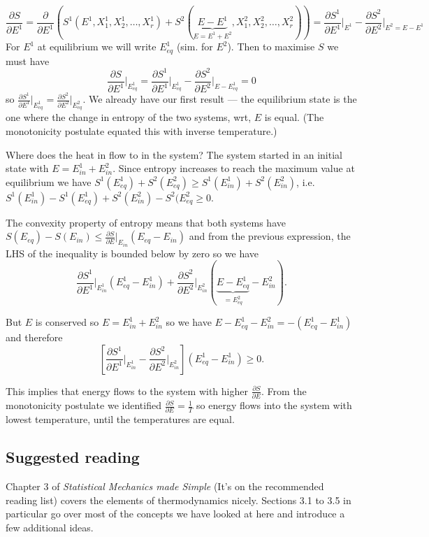 \documentclass{article}
\begin{document}
$$\frac{\partial S}{\partial E^1} = \frac{\partial}{\partial E^1}\left(S^1(E^1,X_1^1,X_2^1,\ldots,X_r^1) + S^2(\underbrace{E-E^1}_{E=E^1+E^2},X_1^2,X_2^2,\ldots,X_r^2) \right) = \frac{\partial S^1}{\partial E^1}\bigg\vert_{E^1} -  \frac{\partial S^2}{\partial E^2}\bigg\vert_{E^2=E-E^1}$$
For $E^1$ at equilibrium we will write $E^1_{eq}$ (sim. for $E^2$). Then to maximise $S$ we must have
$$\frac{\partial S}{\partial E^1}\bigg\vert_{E^1_{eq}} = \frac{\partial S^1}{\partial E^1}\bigg\vert_{E^1_{eq}} - \frac{\partial S^2}{\partial E^2}\bigg\vert_{E-E^1_{eq}}=0$$
so $\frac{\partial S^1}{\partial E^1}\vert_{E^1_{eq}} = \frac{\partial S^2}{\partial E^2}\vert_{E_{eq}^2}$. We already have our first result --- the equilibrium state is the one where the change in entropy of the two systems, wrt, $E$ is equal. (The  monotonicity postulate equated this with inverse temperature.)

Where does the heat in flow to in the system? The system started in an initial state with $E = E^1_{in}+E^2_{in}$. Since entropy increases to reach the maximum  value at equilibrium we have $S^1(E^1_{eq}) + S^2(E^2_{eq}) \geq S^1(E^1_{in}) + S^2(E^2_{in})$, i.e. $ S^1(E^1_{in}) - S^1(E^1_{eq})  +  S^2(E^2_{in}) - S^2(E^2_{eq}\geq 0$.

The convexity property of entropy means that both systems have $S(E_{eq})-S(E_{in})\leq \frac{\partial S}{\partial E}\vert_{E_{in}}(E_{eq}-E_{in})$ and from the previous expression, the LHS of the inequality is bounded below by zero so we have
$$\frac{\partial S^1}{\partial E^1}\bigg\vert_{E^1_{in}}(E_{eq}^1-E_{in}^1) + \frac{\partial S^2}{\partial E^2}\bigg\vert_{E^2_{in}}(\underbrace{E-E_{eq}^1}_{=E^2_{eq}}-E_{in}^2).$$

But $E$ is conserved so $E=E^1_{in}+E^2_{in}$ so we have $E-E^1_{eq}-E^2_{in} = -(E^1_{eq}-E^1_{in})$ and therefore
$$\left[\frac{\partial S^1}{\partial E^1}\bigg\vert_{E^1_{in}} - \frac{\partial S^2}{\partial E^2}\bigg\vert_{E^2_{in}}\right]\left(E^1_{eq}-E^1_{in}\right)\geq 0.$$

This implies that energy flows to the  system with higher $\frac{\partial S}{\partial E}$. From the monotonicity postulate we identified  $\frac{\partial S}{\partial E}= \frac{1}{T}$ so energy flows into the system with lowest temperature, until the temperatures are equal.

\subsection*{Suggested reading}
Chapter 3 of \emph{Statistical Mechanics made Simple} (It's on the recommended reading list) covers the elements of thermodynamics nicely. Sections 3.1 to 3.5 in particular go over most of the concepts we have looked at here and introduce a few additional ideas.
\end{document}

